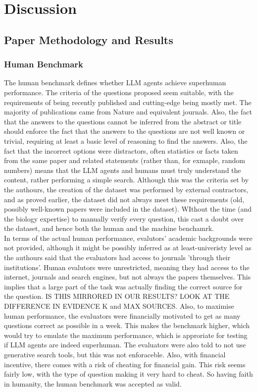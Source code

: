\section{Discussion}
\label{sec:discussion}
\subsection{Paper Methodology and Results}

\subsubsection{Human Benchmark}
The human benchmark defines whether LLM agents achieve superhuman performance. The criteria of the questions proposed seem suitable, with the requirements of being recently published and cutting-edge being mostly met. The majority of publications came from Nature and equivalent journals. Also, the fact that the answers to the questions cannot be inferred from the abstract or title should enforce the fact that the answers to the questions are not well known or trivial, requiring at least a basic level of reasoning to find the answers. Also, the fact that the incorrect options were distractors, often statistics or facts taken from the same paper and related statements (rather than, for exmaple, random numbers) means that the LLM agents and humans must truly understand the content, rather performing a simple search. Although this was the criteria set by the authours, the creation of the dataset was performed by external contractors, and as proved earlier, the dataset did not always meet these requirements (old, possibly well-known papers were included in the dataset). WIthout the time (and the biology expertise) to manually verify every question, this cast a doubt over the dataset, and hence both the human and the machine benchamrk. \\

In terms of the actual human performance, evalutors' academic backgrounds were not provided, although it might be possibly inferred as at least-univeristy level as the authours said that the evaluators had access to journals 'through their institutions'. Human evalutors were unrestricted, meaning they had access to the internet, journals and search engines, but not always the papers themselves. This implies that a large part of the task was actually finding the correct source for the question. IS THIS MIRRORED IN OUR RESULTS? LOOK AT THE DIFFERENCE IN EVIDENCE K and MAX SOURCES. Also, to maximise human performance, the evaluators were financially motivated to get as many questions correct as possible in a week. This makes the benchmark higher, which would try to emulate the maximum performance, which is approriate for testing if LLM agents are indeed superhuman. The evaluators were also told to not use generative search tools, but this was not enforaceble. Also, with financial incentive, there comes with a risk of cheating for financial gain. This risk seems fairly low, with the type of question making it very hard to cheat. So having faith in humanity, the human benchmark was accepted as valid. \\

